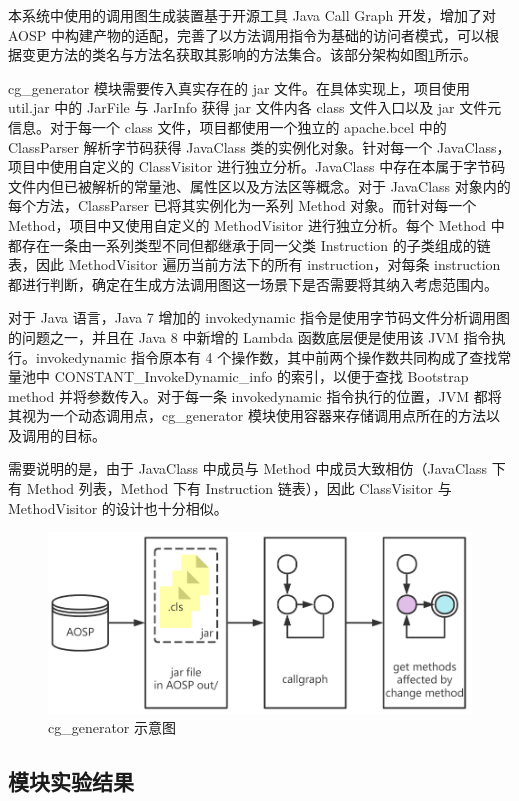 本系统中使用的调用图生成装置基于开源工具 Java Call Graph 开发，增加了对 AOSP 中构建产物的适配，完善了以方法调用指令为基础的访问者模式，可以根据变更方法的类名与方法名获取其影响的方法集合。该部分架构如图\ref{fig:archi-cg-generator}所示。

cg\_generator 模块需要传入真实存在的 jar 文件。在具体实现上，项目使用 util.jar 中的 JarFile 与 JarInfo 获得 jar 文件内各 class 文件入口以及 jar 文件元信息。对于每一个 class 文件，项目都使用一个独立的 apache.bcel 中的 ClassParser 解析字节码获得 JavaClass 类的实例化对象。针对每一个 JavaClass，项目中使用自定义的 ClassVisitor 进行独立分析。JavaClass 中存在本属于字节码文件内但已被解析的常量池、属性区以及方法区等概念。对于 JavaClass 对象内的每个方法，ClassParser 已将其实例化为一系列 Method 对象。而针对每一个 Method，项目中又使用自定义的 MethodVisitor 进行独立分析。每个 Method 中都存在一条由一系列类型不同但都继承于同一父类 Instruction 的子类组成的链表，因此 MethodVisitor 遍历当前方法下的所有 instruction，对每条 instruction 都进行判断，确定在生成方法调用图这一场景下是否需要将其纳入考虑范围内。

对于 Java 语言，Java 7 增加的 invokedynamic 指令是使用字节码文件分析调用图的问题之一，并且在 Java 8 中新增的 Lambda 函数底层便是使用该 JVM 指令执行。invokedynamic 指令原本有 4 个操作数，其中前两个操作数共同构成了查找常量池中 CONSTANT\_InvokeDynamic\_info 的索引，以便于查找 Bootstrap method 并将参数传入。对于每一条 invokedynamic 指令执行的位置，JVM 都将其视为一个动态调用点，cg\_generator 模块使用容器来存储调用点所在的方法以及调用的目标。

需要说明的是，由于 JavaClass 中成员与 Method 中成员大致相仿（JavaClass 下有 Method 列表，Method 下有 Instruction 链表），因此 ClassVisitor 与 MethodVisitor 的设计也十分相似。

\begin{figure}
    \centering
    \includegraphics[width=.8\textwidth]{figures/archi-cg-generator.png}
    \caption{cg\_generator 示意图}
    \label{fig:archi-cg-generator}
\end{figure}

\subsection{模块实验结果}

